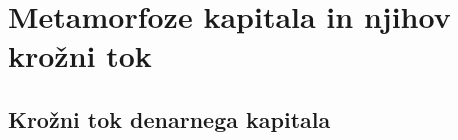\documentclass[egregdoesnotlikesansseriftitles, a5paper, DIV=calc]{scrbook}
\begin{document}
%

\part{Metamorfoze kapitala in njihov krožni tok}

    \chapter{Krožni tok denarnega kapitala}
    









\end{document}
